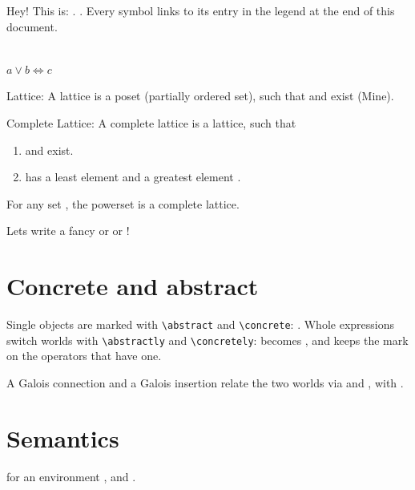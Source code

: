
\usepackage{mathtools}
\usepackage{absint}


Hey! This is: \absexpr{\lor}. \absexpr{\iff}.
Every symbol links to its entry in the legend at the end of this document.

\\
\(a \lor b \iff c\)

Lattice: A lattice  is a poset (partially ordered set), such that  and  exist (Mine).

Complete Lattice: A complete lattice  is a lattice, such that
\begin{enumerate}[nosep]
   \item {} and  exist.
   \item {} has a least element \absexpr{\bot} and a greatest element \absexpr{\top}.
\end{enumerate}

For any set , the powerset  is a complete lattice.

Lets write a fancy  or  or \absexpr{\lub_\#}!

\section{Concrete and abstract}
Single objects are marked with \verb|\abstract| and \verb|\concrete|:
.
Whole expressions switch worlds with \verb|\abstractly| and \verb|\concretely|:
 becomes
, and
 keeps the mark on
the operators that have one.

A Galois connection \absexpr{\galoisbetween{\powerset(\Z)}{\NumericDomain}}
and a Galois insertion \absexpr{\powerset(\Z) \galoisinsertion \NumericDomain}
relate the two worlds via \absexpr{\abstraction} and \absexpr{\concretization},
with \absexpr{\abstraction \compose \concretization \partof \id}.

\section{Semantics}
for an environment \absexpr{\Environment \in \Environments \eq \Variables \to \NumericDomain},
and .

